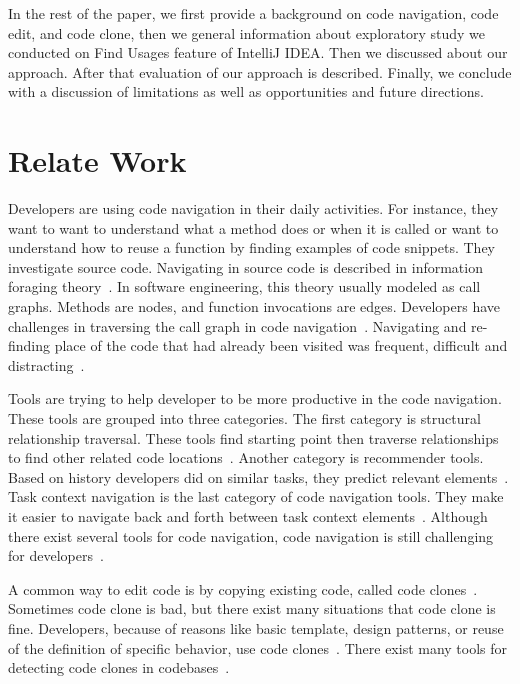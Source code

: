 \documentclass[conference]{IEEEtran}
\begin{document}
In the rest of the paper, we first provide a background on code navigation, code edit, and code clone, then we general information about exploratory study we conducted on Find Usages feature of IntelliJ IDEA. Then we discussed about our approach. After that evaluation of our approach is described. Finally, we conclude with a discussion of limitations as well as opportunities and future directions.

\section{Relate Work}
Developers are using code navigation in their daily activities. For instance, they want to want to understand what a method does or when it is called or want to understand how to reuse a function by finding examples of code snippets. They investigate source code. Navigating in source code is described in information foraging theory~\cite{pirolli1999informationforaging}. In software engineering, this theory usually modeled as call graphs. Methods are nodes, and function invocations are edges. Developers have challenges in traversing the call graph in code navigation~\cite{albusays2017interviews}. Navigating and re-finding place of the code that had already been visited was frequent, difficult and distracting~\cite{ko2005eliciting,deline2005towards}.\par 

Tools are trying to help developer to be more productive in the code navigation. These tools are grouped into three categories. The first category is structural relationship traversal. These tools find starting point then traverse relationships to find other related code locations~\cite{karrer2011stacksplorer,augustine2015field,latoza2011visualizing}. Another category is recommender tools. Based on history developers did on similar tasks, they predict relevant elements~\cite{zimmermann2005mining,deline2005easing}. Task context navigation is the last category of code navigation tools. They make it easier to navigate back and forth between task context elements~\cite{ko2006exploratory}. Although there exist several tools for code navigation, code navigation is still challenging for developers~\cite{albusays2017interviews}. 

A common way to edit code is by copying existing code, called code clones~\cite{codeCloneDetection2019}. Sometimes code clone is bad, but there exist many situations that code clone is fine. Developers, because of reasons like basic template, design patterns, or reuse of the definition of specific behavior, use code clones~\cite{kim2004ethnographic,kapser2008cloning}. There exist many tools for detecting code clones in codebases~\cite{bellon2007comparison}.\par 
\end{document}
